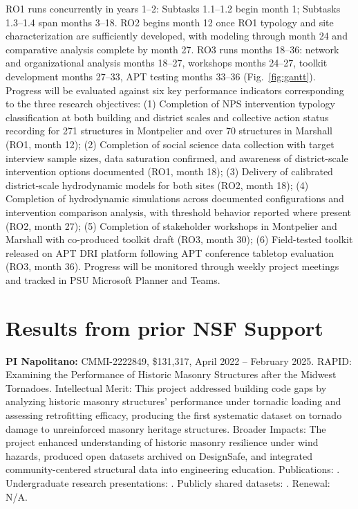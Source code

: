 \documentclass[11pt]{article}
\begin{document}
\newpage 
RO1 runs concurrently in years 1--2: Subtasks 1.1--1.2 begin month 1; Subtasks
1.3--1.4 span months 3--18.
RO2 begins month 12 once RO1 typology and site characterization are sufficiently
developed, with modeling through month 24 and comparative analysis complete by month 27.
RO3 runs months 18--36: network and organizational analysis months 18--27, workshops
months 24--27, toolkit development months 27--33, APT testing months 33--36
(Fig.~\ref{fig:gantt}).
Progress will be evaluated against six key performance indicators corresponding to
the three research objectives:
(1) Completion of NPS intervention typology classification at both building and
district scales and collective action status recording for 271 structures in
Montpelier and over 70 structures in Marshall (RO1, month 12);
(2) Completion of social science data collection with target interview sample sizes,
data saturation confirmed, and awareness of district-scale intervention options
documented (RO1, month 18);
(3) Delivery of calibrated district-scale hydrodynamic models for both sites (RO2,
month 18);
(4) Completion of hydrodynamic simulations across documented configurations and
intervention comparison analysis, with threshold behavior reported where present
(RO2, month 27);
(5) Completion of stakeholder workshops in Montpelier and Marshall with
co-produced toolkit draft (RO3, month 30);
(6) Field-tested toolkit released on APT DRI platform following APT conference
tabletop evaluation (RO3, month 36).
Progress will be monitored through weekly project meetings and tracked in PSU
Microsoft Planner and Teams.
\vspace{-0.3cm}
\section{Results from prior NSF Support}

\textbf{PI Napolitano:}
CMMI-2222849, \$131,317, April 2022 -- February 2025.
RAPID: Examining the Performance of Historic Masonry Structures after the Midwest Tornadoes.
Intellectual Merit: This project addressed building code gaps by analyzing historic masonry structures' performance under tornadic loading and assessing retrofitting efficacy, producing the first systematic dataset on tornado damage to unreinforced masonry heritage structures.
Broader Impacts: The project enhanced understanding of historic masonry resilience under wind hazards, produced open datasets archived on DesignSafe, and integrated community-centered structural data into engineering education.
Publications: \cite{kaushal2023understanding, kaushal2023structural, kaushal2023b, sskmgeometric, sskmdatacollection, sskmstructuralanalysis}.
Undergraduate research presentations: \cite{patelski2022research, whitesides2023research}.
Publicly shared datasets: \cite{steerquad, MapillaryDatasetSteer360, kaushal2023processed, kaushal2023raw}.
Renewal: N/A.
\end{document}
